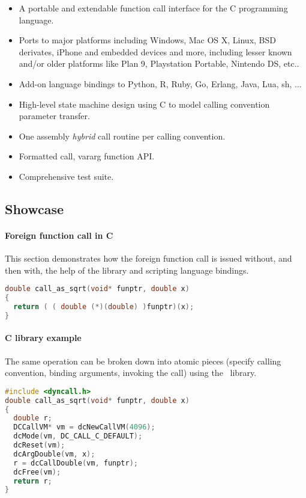 \begin{itemize}
\item A portable and extendable function call interface for the C programming 
language.
\item Ports to major platforms including Windows, Mac OS X, Linux, BSD derivates, iPhone and embedded devices and more, including lesser known and/or older platforms like Plan 9, Playstation Portable, Nintendo DS, etc..
\item Add-on language bindings to Python, R, Ruby, Go, Erlang, Java, Lua, sh, ...
\item High-level state machine design using C to model calling convention
parameter transfer.
\item One assembly \emph{hybrid} call routine per calling convention.
\item Formatted call, vararg function API.
\item Comprehensive test suite.
\end{itemize}

\pagebreak

\subsection{Showcase}

\paragraph{Foreign function call in C}
This section demonstrates how the foreign function call is issued without, and then 
with, the help of the  library and scripting language
bindings.

\begin{lstlisting}[language=c,caption=Foreign function call in C]
double call_as_sqrt(void* funptr, double x)
{
  return ( ( double (*)(double) )funptr)(x);
}
\end{lstlisting}

\paragraph{ C library example}

The same operation can be broken down into atomic pieces 
(specify calling convention, binding arguments, invoking the call)
using the \dc\ library.

\begin{lstlisting}[language=c,caption=Dyncall C library example]
#include <dyncall.h>
double call_as_sqrt(void* funptr, double x)
{
  double r;
  DCCallVM* vm = dcNewCallVM(4096);
  dcMode(vm, DC_CALL_C_DEFAULT);
  dcReset(vm);
  dcArgDouble(vm, x);  
  r = dcCallDouble(vm, funptr);
  dcFree(vm);
  return r;
}
\end{lstlisting}

